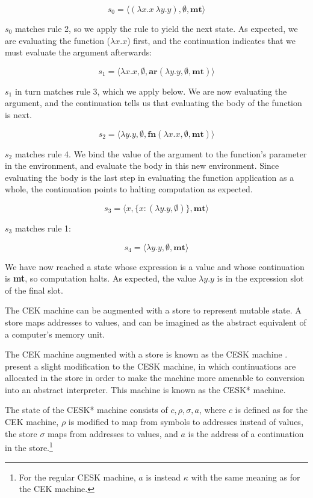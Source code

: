 \documentclass{article}
\begin{document}
$$ s_0 = \langle (\lambda x.x\ \lambda y.y), \emptyset, \textbf{mt} \rangle $$

$s_0$ matches rule 2, so we apply the rule to yield the next state. As expected, we are evaluating the function ($\lambda x.x$) first, and the continuation indicates that we must evaluate the argument afterwards:

$$ s_1 = \langle \lambda x.x, \emptyset, \textbf{ar}(\lambda y.y, \emptyset, \textbf{mt}) \rangle $$

$s_1$ in turn matches rule 3, which we apply below. We are now evaluating the argument, and the continuation tells us that evaluating the body of the function is next.

$$ s_2 = \langle \lambda y.y, \emptyset, \textbf{fn}(\lambda x.x, \emptyset, \textbf{mt}) \rangle $$

$s_2$ matches rule 4. We bind the value of the argument to the function's parameter in the environment, and evaluate the body in this new environment. Since evaluating the body is the last step in evaluating the function application as a whole, the continuation points to halting computation as expected.

$$ s_3 = \langle x, \{ x: (\lambda y.y, \emptyset) \}, \textbf{mt} \rangle $$

$s_3$ matches rule 1:

$$ s_4 = \langle \lambda y.y, \emptyset, \textbf{mt} \rangle $$

We have now reached a state whose expression is a value and whose continuation is \textbf{mt}, so computation halts. As expected, the value $\lambda y.y$ is in the expression slot of the final slot.

The CEK machine can be augmented with a store to represent mutable state. A store maps addresses to values, and can be imagined as the abstract equivalent of a computer's memory unit.

The CEK machine augmented with a store is known as the CESK machine \cite{cesk}. \cite{aam} present a slight modification to the CESK machine, in which continuations are allocated in the store in order to make the machine more amenable to conversion into an abstract interpreter. This machine is known as the CESK* machine.

The state of the CESK* machine consists of $c, \rho, \sigma, a$, where $c$ is defined as for the CEK machine, $\rho$ is modified to map from symbols to addresses instead of values, the store $\sigma$ maps from addresses to values, and $a$ is the address of a continuation in the store.\footnote{For the regular CESK machine, $a$ is instead $\kappa$ with the same meaning as for the CEK machine.}
\end{document}
